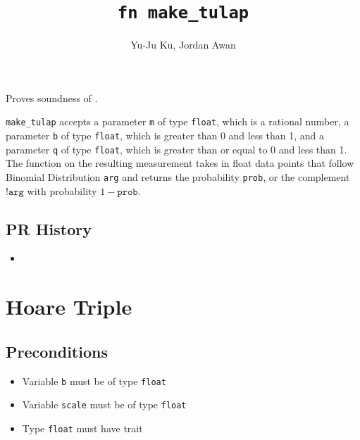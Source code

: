 \documentclass{article}
\title{\texttt{fn make\_tulap}}
\author{Yu-Ju Ku, Jordan Awan}
\begin{document}
\maketitle

\contrib

Proves soundness of .

\texttt{make\_tulap} accepts a parameter \texttt{m} of type \texttt{float}, which is a rational number, a parameter \texttt{b} of type \texttt{float}, which is greater than 0 and less than 1, and a parameter \texttt{q} of type \texttt{float}, which is greater than or equal to 0 and less than 1.
The function on the resulting measurement takes in float data points that follow Binomial Distribution \texttt{arg} and returns the probability \texttt{prob}, or the complement $\texttt{!arg}$ with probability $1 - \texttt{prob}$.


\subsection*{PR History}
\begin{itemize}
    \item \vettingPR{}
\end{itemize}

\section{Hoare Triple}

\subsection*{Preconditions}
\begin{itemize}
    \item Variable \texttt{b} must be of type \texttt{float}
    \item Variable \texttt{scale} must be of type \texttt{float}
    \item Type \texttt{float} must have trait 
\end{itemize}
\end{document}
